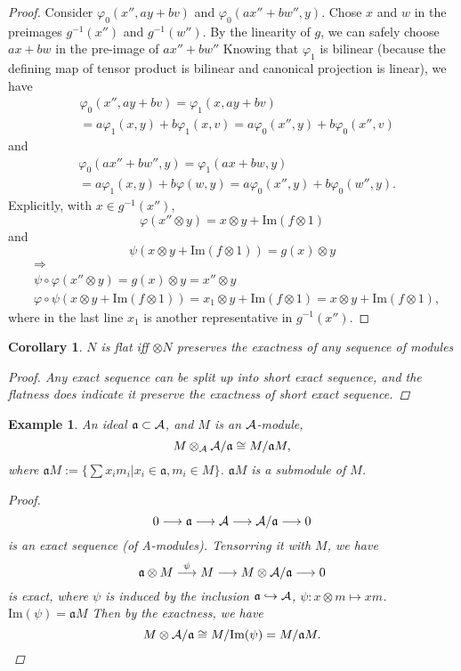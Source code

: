 \documentclass[11pt]{article}
\newtheorem{cor}[thm]{Corollary}
\newtheorem{ex}[thm]{Example}
\newcommand{\sca}{{\mathfrak a}}
\newcommand{\cala}{{\cal A}}
\newcommand{\Lrta}{\Longrightarrow}
\newcommand{\lrta}{\longrightarrow}
\newcommand{\inj}{\hookrightarrow}
\begin{document}
\begin{proof}
Consider  $\varphi_0(x'',ay+bv)$ and $\varphi_0(ax''+bw'',y)$. Chose $x$ and $w$ in the preimages $g^{-1}(x'')$ and $g^{-1}(w'')$. By the linearity of $g$, we can safely choose $ax+bw$ in the pre-image of $ax''+bw''$
Knowing that $\varphi_1$ is bilinear (because the defining map of tensor product is bilinear and canonical projection is linear), we have
$$
\begin{aligned}
&\varphi_0(x'',ay+bv)=\varphi_1(x,ay+bv)\\
&=a\varphi_1(x,y)+b\varphi_1(x,v)=a\varphi_0(x'',y)+b\varphi_0(x'',v)
\end{aligned}
$$
and
$$
\begin{aligned}
&\varphi_0(ax''+bw'',y)=\varphi_1(ax+bw,y)\\
&=a\varphi_1(x,y)+b\varphi(w,y)=a\varphi_0(x'',y)+b\varphi_0(w'',y).
\end{aligned}
$$ 
Explicitly, with $x\in g^{-1}(x'')$, 
$$
\varphi(x''\otimes y)=x\otimes y+\text{Im}(f\otimes 1)
$$
and
$$
\psi(x\otimes y+\text{Im}(f\otimes 1))=g(x)\otimes y
$$
$$
\begin{aligned}
&\Lrta\\
&\psi\circ\varphi(x''\otimes y)=g(x)\otimes y=x''\otimes y\\
&\varphi\circ \psi(x\otimes y+\text{Im}(f\otimes 1))=x_1\otimes y+\text{Im}(f\otimes 1)=x\otimes y+\text{Im}(f\otimes 1),
\end{aligned}
$$
where in the last line $x_1$ is another representative in $g^{-1}(x'')$.
\end{proof}

\begin{cor}
$N$ is flat iff $\otimes N$ preserves the exactness of any sequence of modules
\begin{proof}
Any exact sequence can be split up into short exact sequence, and the flatness does indicate it preserve  the exactness of short exact sequence.
\end{proof}
\end{cor}

\begin{ex}\label{ex:iso_quotient_module}
An ideal
$\sca\subset \cala$, and $M$ is an $\cala$-module,
$$
M\otimes_\cala \cala/\sca\cong M/\sca M,
$$
where $\sca M:=\{\sum x_i m_i|x_i\in \sca, m_i\in M\}$. $\sca M$ is a submodule of $M$.
\begin{proof}
$$
0\lrta \sca\lrta \cala\lrta \cala/\sca\lrta 0 
$$
is an exact sequence (of \cala-modules). Tensorring it with $M$, we have
$$
\sca\otimes M\overset{\psi}{\lrta }M\lrta M\otimes \cala/\sca\lrta 0
$$
is exact, where $\psi $ is induced by the inclusion $\sca\inj\cala$, $\psi:x\otimes m\mapsto xm$. $\text{Im}(\psi)=\sca M$
Then by the exactness, we have
$$
M\otimes \cala/\sca\cong M/\text{Im}(\psi)=M/\sca M.
$$
\end{proof}
\end{ex}
\end{document}

